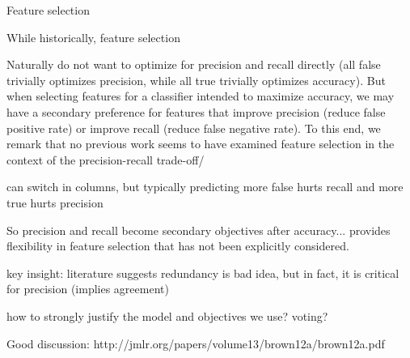 Feature selection 

While historically, feature selection 

Naturally do not want to optimize for precision and recall directly (all false trivially optimizes precision, while all true trivially optimizes accuracy).  But when selecting features for a classifier intended to maximize accuracy, we may have a secondary preference for features that improve precision (reduce false positive rate) or improve recall (reduce false negative rate).  To this end, we remark that no previous work seems to have examined feature selection in the context of the precision-recall trade-off/









can switch in columns, but typically predicting more false hurts recall and more true hurts precision

So precision and recall become secondary objectives after accuracy... provides flexibility in feature selection that has not been explicitly considered.


\COMMENT
key insight: literature suggests redundancy is bad idea, but in fact, it is critical for precision (implies agreement)

how to strongly justify the model and objectives we use?  voting?

Good discussion: http://jmlr.org/papers/volume13/brown12a/brown12a.pdf

